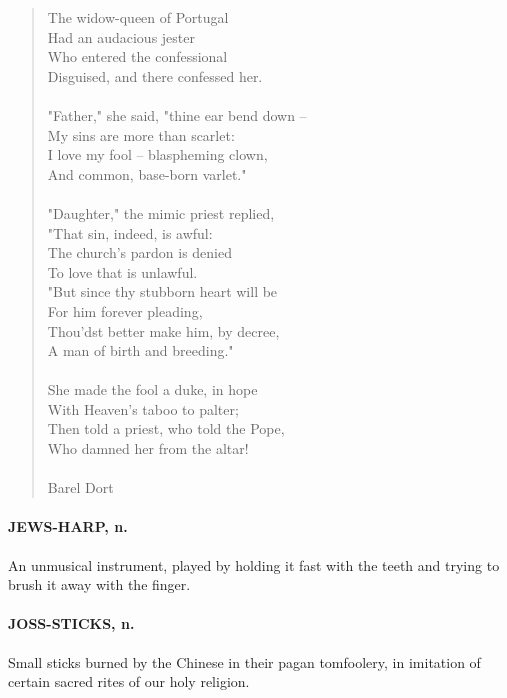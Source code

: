 \documentclass[11pt]{article}
\begin{document}
\begin{quote}   The widow-queen of Portugal \\
      Had an audacious jester \\
  Who entered the confessional \\
      Disguised, and there confessed her. \\
 \\
  "Father," she said, "thine ear bend down -- \\
      My sins are more than scarlet: \\
  I love my fool -- blaspheming clown, \\
      And common, base-born varlet." \\
 \\
  "Daughter," the mimic priest replied, \\
      "That sin, indeed, is awful: \\
  The church's pardon is denied \\
      To love that is unlawful. \\
  "But since thy stubborn heart will be \\
      For him forever pleading, \\
  Thou'dst better make him, by decree, \\
      A man of birth and breeding." \\
 \\
  She made the fool a duke, in hope \\
      With Heaven's taboo to palter; \\
  Then told a priest, who told the Pope, \\
      Who damned her from the altar! \\
 \\
Barel Dort \end{quote}


\paragraph{JEWS-HARP, n.}  An unmusical instrument, played by holding it fast with
the teeth and trying to brush it away with the finger.

\paragraph{JOSS-STICKS, n.}  Small sticks burned by the Chinese in their pagan
tomfoolery, in imitation of certain sacred rites of our holy religion.
\end{document}
